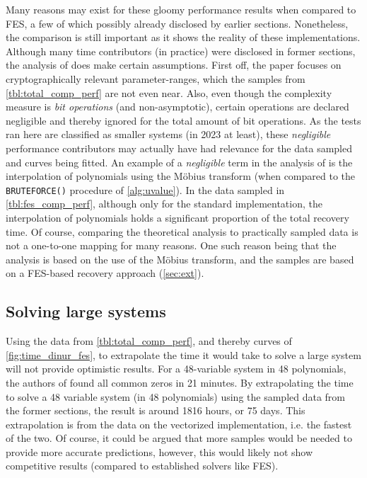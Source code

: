 Many reasons may exist for these gloomy performance results when compared to FES, a few of which possibly already disclosed by earlier sections. Nonetheless, the comparison is still important as it shows the reality of these implementations. Although many time contributors (in practice) were disclosed in former sections, the analysis of \cite{eurocrypt-2021-30841} does make certain assumptions. First off, the paper focuses on cryptographically relevant parameter-ranges, which the samples from \cref{tbl:total_comp_perf} are not even near. Also, even though the complexity measure is \textit{bit operations} (and non-asymptotic), certain operations are declared negligible and thereby ignored for the total amount of bit operations. As the tests ran here are classified as smaller systems (in 2023 at least), these \textit{negligible} performance contributors may actually have had relevance for the data sampled and curves being fitted. An example of a \textit{negligible} term in the analysis of \cite{eurocrypt-2021-30841} is the interpolation of polynomials using the Möbius transform (when compared to the \texttt{BRUTEFORCE()} procedure of \cref{alg:uvalue}). In the data sampled in \cref{tbl:fes_comp_perf}, although only for the standard implementation, the interpolation of polynomials holds a significant proportion of the total recovery time. Of course, comparing the theoretical analysis to practically sampled data is not a one-to-one mapping for many reasons. One such reason being that the analysis is based on the use of the Möbius transform, and the samples are based on a FES-based recovery approach (\cref{sec:ext}).

\subsection{Solving large systems} \label{sec:eval:large}
Using the data from \cref{tbl:total_comp_perf}, and thereby curves of \cref{fig:time_dinur_fes}, to extrapolate the time it would take to solve a large system will not provide optimistic results. For a 48-variable system in 48 polynomials, the authors of \cite{ches-2010-23990} found all common zeros in 21 minutes. By extrapolating the time to solve a 48 variable system (in 48 polynomials) using the sampled data from the former sections, the result is around 1816 hours, or 75 days. This extrapolation is from the data on the vectorized implementation, i.e. the fastest of the two. Of course, it could be argued that more samples would be needed to provide more accurate predictions, however, this would likely not show competitive results (compared to established solvers like FES). 

